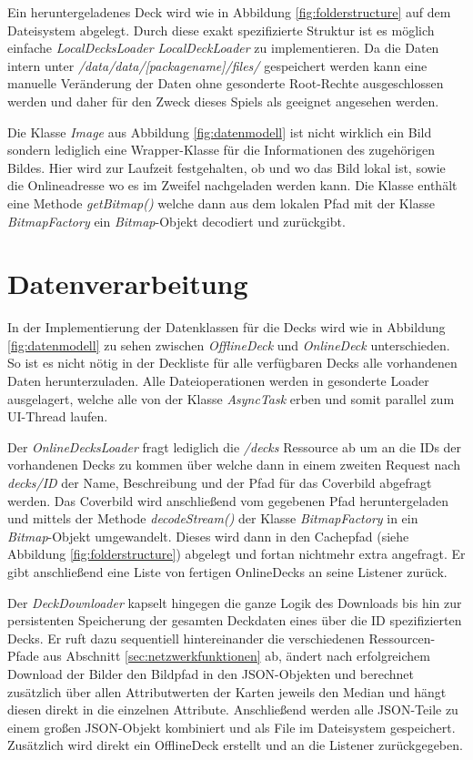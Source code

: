 Ein heruntergeladenes Deck wird wie in Abbildung \ref{fig:folderstructure} auf dem Dateisystem abgelegt. Durch diese exakt spezifizierte Struktur ist es möglich einfache \emph{LocalDecksLoader} \emph{LocalDeckLoader} zu implementieren. Da die Daten intern unter \emph{/data/data/[packagename]/files/} gespeichert werden kann eine manuelle Veränderung der Daten ohne gesonderte Root-Rechte ausgeschlossen werden und daher für den Zweck dieses Spiels als geeignet angesehen werden.

Die Klasse \emph{Image}  aus Abbildung \ref{fig:datenmodell} ist nicht wirklich ein Bild sondern lediglich eine Wrapper-Klasse für die Informationen des zugehörigen Bildes. Hier wird zur Laufzeit festgehalten, ob und wo das Bild lokal ist, sowie die Onlineadresse wo es im Zweifel nachgeladen werden kann. Die Klasse enthält eine Methode \emph{getBitmap()} welche dann aus dem lokalen Pfad mit der Klasse \emph{BitmapFactory} ein \emph{Bitmap}-Objekt decodiert und zurückgibt.


\section{Datenverarbeitung}
In der Implementierung der Datenklassen für die Decks wird wie in Abbildung \ref{fig:datenmodell} zu sehen zwischen \emph{OfflineDeck} und \emph{OnlineDeck} unterschieden. So ist es nicht nötig in der Deckliste für alle verfügbaren Decks alle vorhandenen Daten herunterzuladen. Alle Dateioperationen werden in gesonderte Loader ausgelagert, welche alle von der Klasse \emph{AsyncTask} erben und somit parallel zum UI-Thread laufen.

Der \emph{OnlineDecksLoader} fragt lediglich die \emph{/decks} Ressource ab um an die IDs der vorhandenen Decks zu kommen über welche dann in einem zweiten Request nach \emph{decks/ID} der Name, Beschreibung und der Pfad für das Coverbild abgefragt werden. Das Coverbild wird anschließend vom gegebenen Pfad heruntergeladen und mittels der Methode \emph{decodeStream()} der Klasse \emph{BitmapFactory} in ein \emph {Bitmap}-Objekt umgewandelt. Dieses wird dann in den Cachepfad (siehe Abbildung \ref{fig:folderstructure}) abgelegt und fortan nichtmehr extra angefragt. Er gibt anschließend eine Liste von fertigen OnlineDecks an seine Listener zurück.

Der \emph{DeckDownloader} kapselt hingegen die ganze Logik des Downloads bis hin zur persistenten Speicherung der gesamten Deckdaten eines über die ID spezifizierten Decks. Er ruft dazu sequentiell hintereinander die verschiedenen Ressourcen-Pfade aus Abschnitt \ref{sec:netzwerkfunktionen} ab, ändert nach erfolgreichem Download der Bilder den Bildpfad in den JSON-Objekten und berechnet zusätzlich über allen Attributwerten der Karten jeweils den Median und hängt diesen direkt in die einzelnen Attribute. Anschließend werden alle JSON-Teile zu einem großen JSON-Objekt kombiniert und als File im Dateisystem gespeichert. Zusätzlich wird direkt ein OfflineDeck erstellt und an die Listener zurückgegeben.

